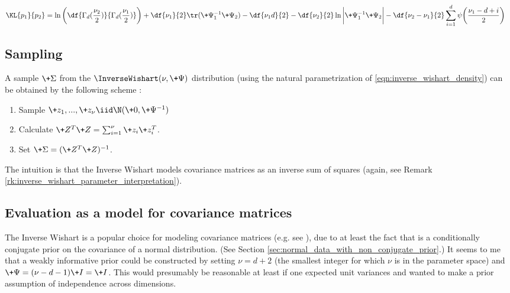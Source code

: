 \documentclass{article} %
\begin{document}
\begin{align*}
\KL{p_1}{p_2} &= \ln \bigg( \df{\Gamma_d ( \frac{\nu_2}{2})}{\Gamma_d (\frac{\nu_1}{2})} \bigg) + \df{\nu_1}{2} \tr(\+\Psi_1^{-1} \+\Psi_2) - \df{\nu_1 d}{2} - \df{\nu_2}{2} \ln \bigg| \+\Psi_1^{-1} \+\Psi_2 \bigg| - \df{\nu_2 - \nu_1}{2}\sum_{i=1}^d \psi \bigg( \frac{\nu_1 - d + i}{2}  \bigg)
\end{align*}

\subsection{Sampling}

A sample $\+\Sigma$ from the $\InverseWishart(\nu, \+\Psi)$ distribution (using the natural parametrization of \eqref{eqn:inverse_wishart_density}) can be obtained by the following scheme \cite{hoff2009first}:

\begin{enumerate}
\item Sample $\+z_1, ..., \+z_{\nu} \iid \N (\+0,  \+\Psi^{-1})$
\item Calculate $\+Z^T \+Z = \sum_{i=1}^\nu \+z_i \+z_i^T$.
\item Set $\+\Sigma = ( \+Z^T \+Z )^{-1}$.
\end{enumerate}
The intuition is that the Inverse Wishart models covariance matrices as an inverse sum of squares (again, see Remark \ref{rk:inverse_wishart_parameter_interpretation}).  

\subsection{Evaluation as a model for covariance matrices}

The  Inverse Wishart is a popular choice for modeling covariance matrices (e.g.  see \cite{hoff2009first}),  due to at least the fact that is a  conditionally conjugate prior on the covariance of a normal distribution.   (See Section \ref{sec:normal_data_with_non_conjugate_prior}.)   It seems to me that a weakly informative prior could be constructed by setting  $\nu = d+2$ (the smallest integer for which $\nu$ is in the parameter space) and $\+\Psi = (\nu -d - 1) \+I = \+I$.   This would presumably be reasonable at least if one expected unit variances and wanted to make a prior assumption of independence across dimensions.
\end{document}
